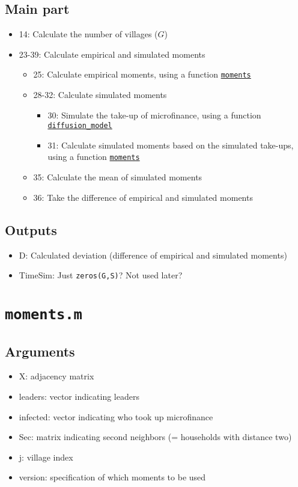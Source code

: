\documentclass[10pt,letterpaper]{article}
\begin{document}
\subsection*{Main part}
\begin{itemize}
  \item 14: Calculate the number of villages ($G$)
  \item 23-39: Calculate empirical and simulated moments
    \begin{itemize}
      \item 25: Calculate empirical moments, using a function \hyperref[moments]{\texttt{moments}}
      \item 28-32: Calculate simulated moments
        \begin{itemize}
          \item 30: Simulate the take-up of microfinance, using a function \hyperref[diffusion_model]{\texttt{diffusion\_model}}
          \item 31: Calculate simulated moments based on the simulated take-ups, using a function \hyperref[moments]{\texttt{moments}}
        \end{itemize}
      \item 35: Calculate the mean of simulated moments
      \item 36: Take the difference of empirical and simulated moments
    \end{itemize}
\end{itemize}

\subsection*{Outputs}
\begin{itemize}
  \item D: Calculated deviation (difference of empirical and simulated moments)
  \item TimeSim: Just \texttt{zeros(G,S)}? Not used later?
\end{itemize}

\section{\texttt{moments.m}}\label{moments}

\subsection*{Arguments}
\begin{itemize}
  \item X: adjacency matrix
  \item leaders: vector indicating leaders
  \item infected: vector indicating who took up microfinance
  \item Sec: matrix indicating second neighbors (= households with distance two)
  \item j: village index
  \item version: specification of which moments to be used
\end{itemize}
\end{document}
